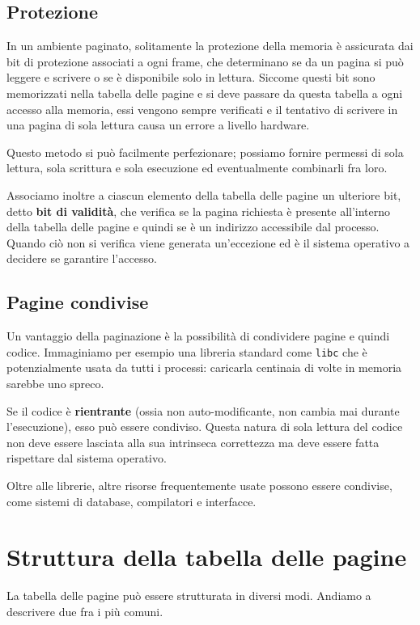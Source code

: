     \subsection{Protezione}
        In un ambiente paginato, solitamente la protezione della memoria è assicurata dai bit di protezione associati a ogni frame, che determinano se da un pagina si può leggere e scrivere o se è disponibile solo in lettura. Siccome questi bit sono memorizzati nella tabella delle pagine e si deve passare da questa tabella a ogni accesso alla memoria, essi vengono sempre verificati e il tentativo di scrivere in una pagina di sola lettura causa un errore a livello hardware.
        
        Questo metodo si può facilmente perfezionare; possiamo fornire permessi di sola lettura, sola scrittura e sola esecuzione ed eventualmente combinarli fra loro.
        
        Associamo inoltre a ciascun elemento della tabella delle pagine un ulteriore bit, detto \textbf{bit di validità}, che verifica se la pagina richiesta è presente all'interno della tabella delle pagine e quindi se è un indirizzo accessibile dal processo. Quando ciò non si verifica viene generata un'eccezione ed è il sistema operativo a decidere se garantire l'accesso.
        
    \subsection{Pagine condivise}
        Un vantaggio della paginazione è la possibilità di condividere pagine e quindi codice. Immaginiamo per esempio una libreria standard come \texttt{libc} che è potenzialmente usata da tutti i processi: caricarla centinaia di volte in memoria sarebbe uno spreco.
        
        Se il codice è \textbf{rientrante} (ossia non auto-modificante, non cambia mai durante l'esecuzione), esso può essere condiviso. Questa natura di sola lettura del codice non deve essere lasciata alla sua intrinseca correttezza ma deve essere fatta rispettare dal sistema operativo.
        
        Oltre alle librerie, altre risorse frequentemente usate possono essere condivise, come sistemi di database, compilatori e interfacce.
        
\section{Struttura della tabella delle pagine}
    La tabella delle pagine può essere strutturata in diversi modi. Andiamo a descrivere due fra i più comuni.
    
